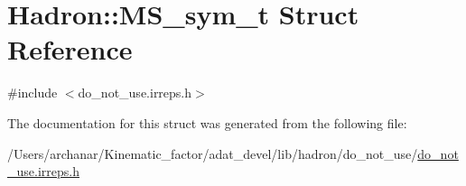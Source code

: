 \hypertarget{structHadron_1_1MS__sym__t}{}\section{Hadron\+:\+:M\+S\+\_\+sym\+\_\+t Struct Reference}
\label{structHadron_1_1MS__sym__t}


{\ttfamily \#include $<$do\+\_\+not\+\_\+use.\+irreps.\+h$>$}



The documentation for this struct was generated from the following file\+:\begin{DoxyCompactItemize}
\item 
/\+Users/archanar/\+Kinematic\+\_\+factor/adat\+\_\+devel/lib/hadron/do\+\_\+not\+\_\+use/\mbox{\hyperlink{do__not__use_8irreps_8h}{do\+\_\+not\+\_\+use.\+irreps.\+h}}\end{DoxyCompactItemize}
